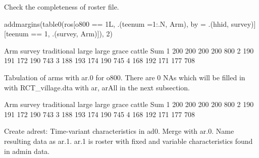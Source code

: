 Check the completeness of roster file.
\begin{Schunk}
\begin{Sinput}
addmargins(table0(ros[o800 == 1L, .(teenum =1:.N, Arm), 
  by = .(hhid, survey)][teenum == 1, .(survey, Arm)]), 2)
\end{Sinput}
\begin{Soutput}
      Arm
survey traditional large large grace cattle Sum
     1         200   200         200    200 800
     2         190   191         172    190 743
     3         188   193         174    190 745
     4         168   192         171    177 708
\end{Soutput}
\end{Schunk}



Tabulation of arms with \textsf{ar.0} for \textsf{o800}. There are 0 NAs which will be filled in with \textsf{RCT\_village.dta} with \textsf{ar, arAll} in the next subsection.
\begin{Schunk}
\begin{Soutput}
      Arm
survey traditional large large grace cattle Sum
     1         200   200         200    200 800
     2         190   191         172    190 743
     3         188   193         174    190 745
     4         168   192         171    177 708
\end{Soutput}
\end{Schunk}

Create \textsf{adrest}: Time-variant characteristics in \textsf{ad0}. Merge with \textsf{ar.0}. Name resulting data as \textsf{ar.1}. \textsf{ar.1} is roster with fixed and variable characteristics found in admin data.

